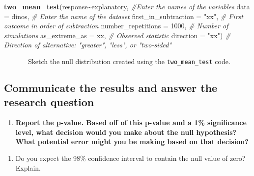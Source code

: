 \documentclass[
]{report}
\newenvironment{Shaded}{\begin{snugshade}}{\end{snugshade}}
\newcommand{\AttributeTok}[1]{\textcolor[rgb]{0.13,0.29,0.53}{#1}}
\newcommand{\CommentTok}[1]{\textcolor[rgb]{0.56,0.35,0.01}{\textit{#1}}}
\newcommand{\DecValTok}[1]{\textcolor[rgb]{0.00,0.00,0.81}{#1}}
\newcommand{\FunctionTok}[1]{\textcolor[rgb]{0.13,0.29,0.53}{\textbf{#1}}}
\newcommand{\NormalTok}[1]{#1}
\newcommand{\SpecialCharTok}[1]{\textcolor[rgb]{0.81,0.36,0.00}{\textbf{#1}}}
\newcommand{\StringTok}[1]{\textcolor[rgb]{0.31,0.60,0.02}{#1}}
\providecommand{\tightlist}{%
  \setlength{\itemsep}{0pt}\setlength{\parskip}{0pt}}
\begin{document}
\begin{Shaded}
\begin{Highlighting}[]
\FunctionTok{two\_mean\_test}\NormalTok{(response}\SpecialCharTok{\textasciitilde{}}\NormalTok{explanatory, }\CommentTok{\#Enter the names of the variables}
              \AttributeTok{data =}\NormalTok{ dinos,  }\CommentTok{\# Enter the name of the dataset}
              \AttributeTok{first\_in\_subtraction =} \StringTok{"xx"}\NormalTok{, }\CommentTok{\# First outcome in order of subtraction}
              \AttributeTok{number\_repetitions =} \DecValTok{1000}\NormalTok{,  }\CommentTok{\# Number of simulations}
              \AttributeTok{as\_extreme\_as =}\NormalTok{ xx,  }\CommentTok{\# Observed statistic}
              \AttributeTok{direction =} \StringTok{"xx"}\NormalTok{)  }\CommentTok{\# Direction of alternative: "greater", "less", or "two{-}sided"}
\end{Highlighting}
\end{Shaded}

~~~~~~~Sketch the null distribution created using the \texttt{two\_mean\_test} code.

\vspace{1.5in}

\hypertarget{communicate-the-results-and-answer-the-research-question-3}{%
\subsection*{Communicate the results and answer the research question}\label{communicate-the-results-and-answer-the-research-question-3}}

\begin{enumerate}
\def\labelenumi{\arabic{enumi}.}
\setcounter{enumi}{10}
\tightlist
\item
  \textbf{Report the p-value. Based off of this p-value and a 1\% significance level, what decision would you make about the null hypothesis? What potential error might you be making based on that decision?}
\end{enumerate}

\vspace{0.5in}

\begin{enumerate}
\def\labelenumi{\arabic{enumi}.}
\setcounter{enumi}{11}
\tightlist
\item
  Do you expect the 98\% confidence interval to contain the null value of zero? Explain.
\end{enumerate}
\end{document}
